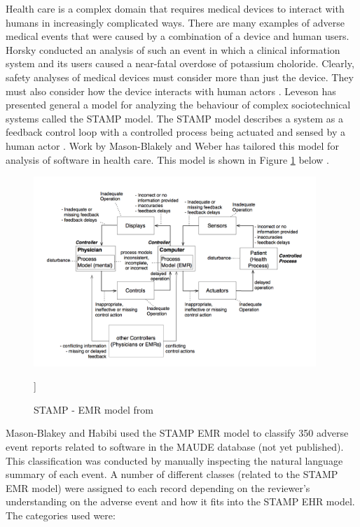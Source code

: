 \documentclass[11pt, notitlepage,abstracton,oneside]{article}   	%
\begin{document}
Health care is a complex domain that requires medical devices to interact with humans in increasingly complicated ways. There are many examples of adverse medical events that were caused by a combination of a device and human users. Horsky conducted an analysis of such an event \cite{horsky_2005} in which a clinical information system and its users caused a near-fatal overdose of potassium choloride. Clearly, safety analyses of medical devices must consider more than just the device. They must also consider how the device interacts with human actors \cite{karsh_health_2010}. Leveson has presented general a model for analyzing the behaviour of complex sociotechnical systems called the STAMP model. The STAMP model describes a system as a feedback control loop with a controlled process being actuated and sensed by a human actor \cite{leveson_engineering_2012}. Work by Mason-Blakely and Weber has tailored this model for analysis of software in health care. This model is shown in Figure \ref{fig:stamp-emr} below \cite{stamp_emr_2011}.

\begin{figure}[ht]
	\centering
	\includegraphics[width=0.95\textwidth]{figures/stamp-emr}
	\caption{STAMP - EMR model from \cite{stamp_emr_2011}}
	]\label{fig:stamp-emr}
\end{figure}

Mason-Blakey and Habibi used the STAMP EMR model to classify 350 adverse event reports related to software in the MAUDE database (not yet published). This classification was conducted by manually inspecting the natural language summary of each event. A number of different classes (related to the STAMP EMR model) were assigned to each record depending on the reviewer's understanding on the adverse event and how it fits into the STAMP EHR model. The categories used were: 
\end{document}
